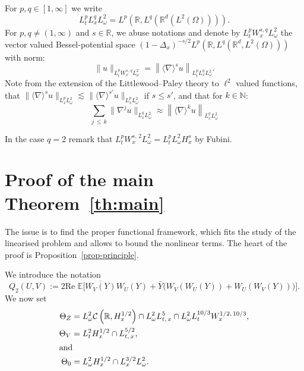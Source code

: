 \documentclass[AHL, Unicode, longabstracts,published]{cedram}
\newcommand{\R}{\mathbb{R}}
\newcommand{\N}{\mathbb{N}}
\newcommand{\E}{\mathbb{E}}
\newcommand{\mclC}{\mathcal{C}}
\begin{document}
\begin{nota}
For $p,q\in [1,\infty]$ we write
\[
L^p_tL^q_x L^2_\omega= L^p\left(\R,L^q\left(\R^d\left(L^2(\Omega)\right)\right)\right).
\]
For $p,q\neq (1,\infty)$ and $s\in \R$, we abuse notations and denote by $L^p_t W^{s,q}_x L^2_\omega $ the vector valued Bessel-potential space $(1-\Delta_x)^{-s/2}L^p(\R,L^{q}(\R^d,L^2(\Omega)))$ with norm:
\[
\| u \|_{L^p_t W^{s,\,q}_x L^2_\omega}= \left\| \langle \nabla \rangle^{s} u \right\|_{L^p_tL^q_xL^2_\omega}.
\]
Note from the extension of the Littlewood--Paley theory to $\ell^2$ valued functions, that $\| \langle \nabla \rangle^s u \|_{L^p_xL^2_\omega}\lesssim \| \langle \nabla \rangle^{s'} u \|_{L^p_xL^2_\omega}$ if $s\leq s'$, and that for $k\in \N$:
\begin{equation}\label{id:vectorvaluedbesselpotential}
\sum_{j\,\leq\,k} \| \nabla^j u \|_{L^q_x L^2_\omega}\approx \left\| \langle \nabla \rangle^k u \right\|_{L^q_xL^2_\omega}
\end{equation}

In the case $q=2$ remark that $L^p_tW^{s,\,2}_xL^2_\omega =L^p_t L^2_\omega H^{s}_x$ by Fubini.
\end{nota}



\section{Proof of the main Theorem~\ref{th:main}}\label{sec:proof}


The issue is to find the proper functional framework, which fits the study of the linearised problem and allows to bound the nonlinear terms. The heart of the proof is Proposition~\ref{prop-principle}.

We introduce the notation
\begin{equation} \label{id:defQ2}
Q_2(U,V) := 2\textrm{Re }\E\Big[\overline{W_V(Y)} W_U(Y) + \bar Y \Big(W_V(W_U(Y)) + W_U(W_V(Y))\Big) \Big].
\end{equation}
We now set
\begin{align} 
\Theta_Z &= L^2_\omega\mclC\left(\R, H^{1/2}_x\right) \cap L^2_\omega L^5_{t,\,x} \cap L^2_\omega L^{10/3}_t W^{1/2,\,10/3}_x,\label{id:ThetaZ}
\\
\Theta_V &= L^2_{t}H^{1/2}_x \cap L^{5/2}_{t,\,x},\label{id:ThetaV}
\\
\intertext{and}
\Theta_0 &= L^2_\omega H^{1/2}_x \cap L^{3/2}_x L^2_\omega.
\label{id:Theta0}
\end{align}
\end{document}
